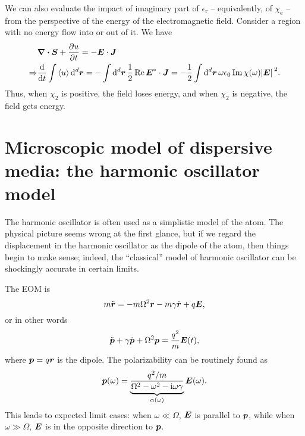 \documentclass[hyperref, a4paper]{article}
\newcommand*{\ii}{\mathrm{i}}
\newcommand{\epsr}{\epsilon_{\text{r}}}
\begin{document}
We can also evaluate the impact of imaginary part of $\epsr$ 
-- equivalently, of $\chi_{\text{e}}$ -- 
from the perspective of the energy of the electromagnetic field.
Consider a region with no energy flow into or out of it.
We have 
\begin{equation}
    \begin{aligned}
        &\div{\vb*{S}} + \pdv{u}{t} = - \vb*{E} \cdot \vb*{J} \\
        \Rightarrow& \dv{t} \int \expval{u} \dd[d]{\vb*{r}} 
        = - \int \dd[d]{\vb*{r}} \frac{1}{2} \Re \vb*{E}^* \cdot \vb*{J}   
        = - \frac{1}{2} \int \dd[d]{\vb*{r}} \omega \epsilon_0 \Im \chi(\omega) \abs*{\vb*{E}}^2.
    \end{aligned}
\end{equation}
Thus, when $\chi_2$ is positive, 
the field loses energy, 
and when $\chi_2$ is negative, 
the field gets energy.

\section{Microscopic model of dispersive media: the harmonic oscillator model}

The harmonic oscillator is often used as a simplistic model of the atom.
The physical picture seems wrong at the first glance, 
but if we regard the displacement in the harmonic oscillator
as the dipole of the atom, 
then things begin to make sense; 
indeed, the ``classical'' model of harmonic oscillator 
can be shockingly accurate in certain limits.

The EOM is  
\begin{equation}
    m \ddot{\vb*{r}} = - m \Omega^2 \vb*{r} - m \gamma \dot{\vb*{r}}
    + q \vb*{E},
\end{equation}
or in other words 
\begin{equation}
    \ddot{\vb*{p}} + \gamma \dot{\vb*{p}} + \Omega^2 \vb*{p}
    = \frac{q^2}{m} \vb*{E}(t),
\end{equation}
where $\vb*{p} = q \vb*{r}$ is the dipole.
%
The polarizability can be routinely found as 
\begin{equation}
    \vb*{p}(\omega) = \underbrace{
        \frac{q^2 / m}{\Omega^2 - \omega^2 - \ii \omega \gamma}
    }_{\alpha(\omega)} \vb*{E}(\omega).
\end{equation}
This leads to expected limit cases: 
when $\omega \ll \Omega$, 
$\vb*{E}$ is parallel to $\vb*{p}$,
while when $\omega \gg \Omega$,
$\vb*{E}$ is in the opposite direction to $\vb*{p}$.
\end{document}
